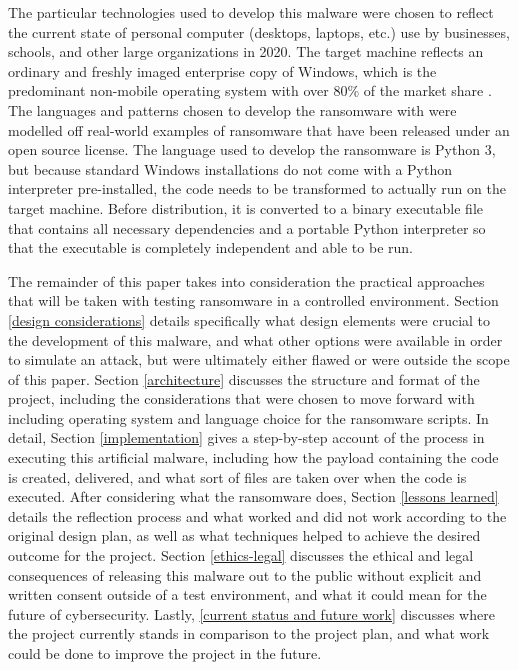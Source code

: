 \documentclass[sigconf]{acmart}
\begin{document}
    The particular technologies used to develop this malware were chosen to reflect the current state of personal computer (desktops, laptops, etc.) use by businesses, schools, and other large organizations in 2020. The target machine reflects an ordinary and freshly imaged enterprise copy of Windows, which is the predominant non-mobile operating system with over 80\% of the market share \cite{Netmarketshare_2020}. The languages and patterns chosen to develop the ransomware with were modelled off real-world examples of ransomware that have been released under an open source license. The language used to develop the ransomware is Python 3, but because standard Windows installations do not come with a Python interpreter pre-installed, the code needs to be transformed to actually run on the target machine. Before distribution, it is converted to a binary executable file that contains all necessary dependencies and a portable Python interpreter so that the executable is completely independent and able to be run.
    
    The remainder of this paper takes into consideration the practical approaches that will be taken with testing ransomware in a controlled environment. Section \ref{design considerations} details specifically what design elements were crucial to the development of this malware, and what other options were available in order to simulate an attack, but were ultimately either flawed or were outside the scope of this paper. Section \ref{architecture} discusses the structure and format of the project, including the considerations that were chosen to move forward with including operating system and language choice for the ransomware scripts. In detail, Section \ref{implementation} gives a step-by-step account of the process in executing this artificial malware, including how the payload containing the code is created, delivered, and what sort of files are taken over when the code is executed. After considering what the ransomware does, Section \ref{lessons learned} details the reflection process and what worked and did not work according to the original design plan, as well as what techniques helped to achieve the desired outcome for the project. Section \ref{ethics-legal} discusses the ethical and legal consequences of releasing this malware out to the public without explicit and written consent outside of a test environment, and what it could mean for the future of cybersecurity. Lastly, \ref{current status and future work} discusses where the project currently stands in comparison to the project plan, and what work could be done to improve the project in the future.
    
\end{document}
